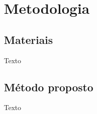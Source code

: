 \section{Metodologia}
\label{c.metodologia}

\subsection{Materiais}
\label{c.metodologia_materiais}

Texto

\subsection{Método proposto}
\label{c.metodologia_metodo}

Texto
